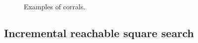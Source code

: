 \documentclass[a4paper,11pt]{article}
\renewcommand{\*}[0]{\cdot}
\begin{document}
\begin{figure}[h!]
  \begin{center}
  \end{center}
  \caption{Examples of corrals.}
  \label{fig:corrals}
\end{figure}


\subsection{Incremental reachable square search}
\end{document}
